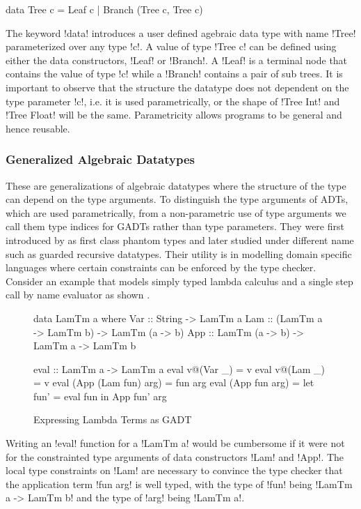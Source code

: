 \documentclass[manuscript,screen,nonacm]{acmart}
\begin{document}
\begin{code}
  data Tree c = Leaf c | Branch (Tree c, Tree c)
\end{code}

The keyword !data! introduces a user defined agebraic data type with name !Tree! parameterized over any type !c!. A value of type !Tree c! can be defined using either the data constructors, !Leaf! or !Branch!. A !Leaf! is a terminal node that contains the value of type !c! while a !Branch! contains a pair of sub trees. It is important to observe that the structure the datatype does not dependent on the type parameter !c!, i.e. it is used parametrically, or the shape of !Tree Int! and !Tree Float! will be the same. Parametricity allows programs to be general and hence reusable.

\subsubsection{Generalized Algebraic Datatypes}
These are generalizations of algebraic datatypes where the structure of the type can depend on the type arguments. To distinguish the type arguments of ADTs, which are used parametrically, from a non-parametric use of type arguments we call them type indices for GADTs rather than type parameters. They were first introduced by \citep{cheney_first-class_2003} as first class phantom types and later studied under different name such as guarded recursive datatypes\cite{xi_guarded_2003}. Their utility is in modelling domain specific languages where certain constraints can be enforced by the type checker. Consider an example that models simply typed lambda calculus and a single step call by name evaluator as shown .
\begin{figure}[ht]
  \centering
  \begin{minipage}[ht]{0.5\linewidth}
    \begin{code}
data LamTm a where
  Var :: String -> LamTm a
  Lam :: (LamTm a -> LamTm b) -> LamTm (a -> b)
  App :: LamTm (a -> b) -> LamTm a -> LamTm b
    \end{code}
  \end{minipage}%
  \begin{minipage}[ht]{0.5\linewidth}
    \begin{code}
      eval :: LamTm a -> LamTm a
      eval v@(Var _) = v
      eval v@(Lam _) = v
      eval (App (Lam fun) arg) = fun arg
      eval (App fun arg) = let fun' = eval fun
                           in App fun' arg
    \end{code}
  \end{minipage}
  \caption{Expressing Lambda Terms as GADT}
  \label{fig:gadt-example}
\end{figure}
Writing an !eval! function for a !LamTm a! would be cumbersome if it were not for the constrainted type arguments of data constructors !Lam! and !App!. The local type constraints on !Lam! are necessary to convince the type checker that the application term !fun arg! is well typed, with the type of !fun! being !LamTm a -> LamTm b! and the type of !arg! being !LamTm a!.
\end{document}
